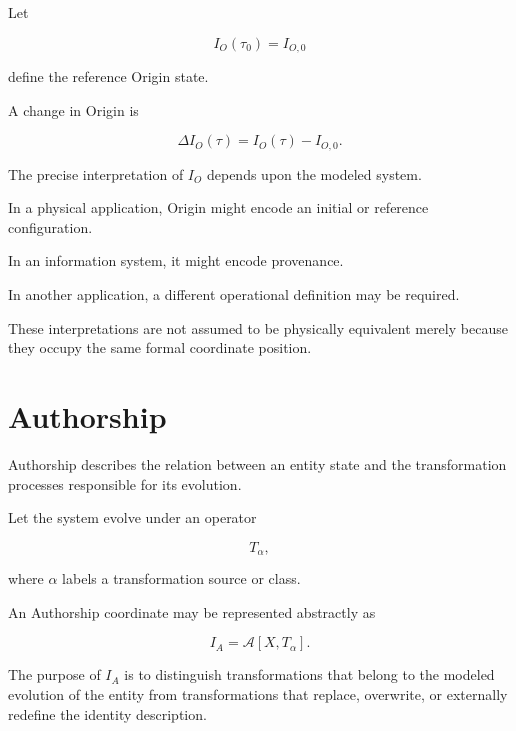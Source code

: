 \documentclass[12pt,oneside]{book}
\begin{document}
Let

\begin{equation}
    I_O(\tau_0)
    =
    I_{O,0}
    \label{eq:origin-reference-state}
\end{equation}

define the reference Origin state.

A change in Origin is

\begin{equation}
    \Delta I_O(\tau)
    =
    I_O(\tau)
    -
    I_{O,0}.
    \label{eq:origin-displacement}
\end{equation}

The precise interpretation of \(I_O\) depends upon the modeled
system.

In a physical application, Origin might encode an initial or
reference configuration.

In an information system, it might encode provenance.

In another application, a different operational definition may
be required.

These interpretations are not assumed to be physically
equivalent merely because they occupy the same formal coordinate
position.


\section{Authorship}
\label{sec:identity-authorship}

Authorship describes the relation between an entity state and
the transformation processes responsible for its evolution.

Let the system evolve under an operator

\begin{equation}
    T_\alpha,
\end{equation}

where \(\alpha\) labels a transformation source or class.

An Authorship coordinate may be represented abstractly as

\begin{equation}
    I_A
    =
    \mathcal{A}
    \left[
        X,
        T_\alpha
    \right].
    \label{eq:authorship-functional}
\end{equation}

The purpose of \(I_A\) is to distinguish transformations that
belong to the modeled evolution of the entity from
transformations that replace, overwrite, or externally redefine
the identity description.
\end{document}
